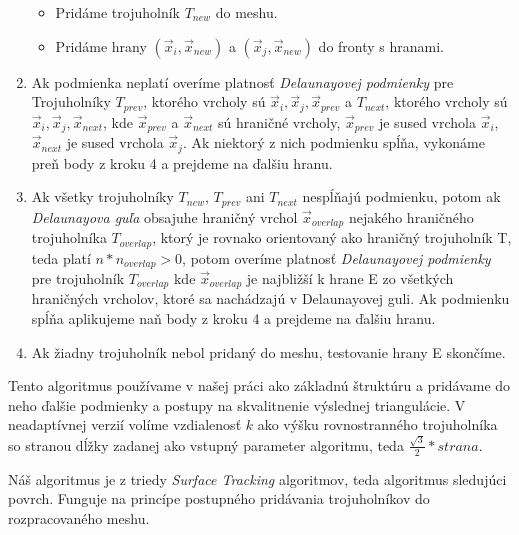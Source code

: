 \begin{enumerate}
{\begin{itemize}
        \item{Pridáme trojuholník $T_{new}$ do meshu.}
        \item{Pridáme hrany $(\overrightarrow{x}_i, \overrightarrow{x}_{new})$ a 
        $(\overrightarrow{x}_j, \overrightarrow{x}_{new})$ do fronty s hranami.}
    \end{itemize}
    }
    \item{
        Ak podmienka neplatí overíme platnosť \textit{Delaunayovej podmienky} pre Trojuholníky 
        $T_{prev}$, ktorého vrcholy sú $\overrightarrow{x}_i, \overrightarrow{x}_j, 
        \overrightarrow{x}_{prev}$ a $T_{next}$, ktorého vrcholy sú 
        $\overrightarrow{x}_i, \overrightarrow{x}_j, \overrightarrow{x}_{next}$, kde 
        $\overrightarrow{x}_{prev}$ a $\overrightarrow{x}_{next}$ sú hraničné vrcholy, 
        $\overrightarrow{x}_{prev}$ 
        je sused vrchola $\overrightarrow{x}_i$, $\overrightarrow{x}_{next}$ je sused vrchola 
        $\overrightarrow{x}_j$. Ak niektorý z nich podmienku
        spĺňa, vykonáme preň body z kroku 4 a prejdeme na ďalšiu hranu.
    }
    \item{
        Ak všetky trojuholníky $T_{new}$, $T_{prev}$ ani $T_{next}$ nespĺňajú podmienku, potom 
        ak \textit{Delaunayova guľa} obsajuhe hraničný vrchol $\overrightarrow{x}_{overlap}$ nejakého hraničného 
        trojuholníka $T_{overlap}$, ktorý je rovnako orientovaný ako hraničný trojuholník T, teda
        platí $n*n_{overlap} > 0$, potom overíme platnosť \textit{Delaunayovej podmienky} pre 
        trojuholník $T_{overlap}$ kde $\overrightarrow{x}_{overlap}$ je najbližší k hrane E zo všetkých hraničných
        vrcholov, ktoré sa nachádzajú v Delaunayovej guli. Ak podmienku spĺňa aplikujeme naň body z 
        kroku 4 a prejdeme na ďalšiu hranu.
    }
    \item{
        Ak žiadny trojuholník nebol pridaný do meshu, testovanie hrany E skončíme.
    }
\end{enumerate}

Tento algoritmus používame v našej práci ako základnú štruktúru a pridávame do neho ďalšie podmienky 
a postupy na skvalitnenie výslednej triangulácie. V neadaptívnej verzií volíme vzdialenosť $k$ ako 
výšku rovnostranného trojuholníka so stranou dĺžky zadanej ako vstupný parameter algoritmu, teda 
$\frac{\sqrt{3}}{2}*strana$.

Náš algoritmus je z triedy \textit{Surface Tracking} algoritmov, teda algoritmus sledujúci povrch.
Funguje na princípe postupného pridávania trojuholníkov do rozpracovaného meshu.

